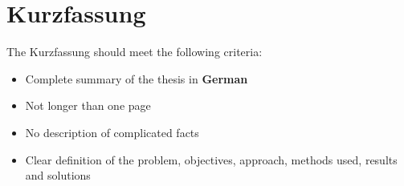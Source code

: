 \chapter{Kurzfassung}

The Kurzfassung should meet the following criteria:
\begin{itemize}
	\item Complete summary of the thesis in \textbf{German}
	\item Not longer than one page
	\item No description of complicated facts
	\item Clear definition of the problem, objectives, approach, methods used, results and solutions
\end{itemize}
